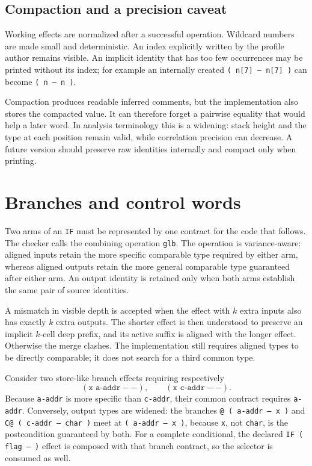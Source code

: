 \documentclass[10pt,a4paper]{article}
\begin{document}
\subsection{Compaction and a precision caveat}

Working effects are normalized after a successful operation.  Wildcard
numbers are made small and deterministic.  An index explicitly written by the
profile author remains visible.  An implicit identity that has too few
occurrences may be printed without its index; for example an internally
created \texttt{( n[7] -- n[7] )} can become \texttt{( n -- n )}.

Compaction produces readable inferred comments, but the implementation also
stores the compacted value.  It can therefore forget a pairwise equality that
would help a later word.  In analysis terminology this is a widening: stack
height and the type at each position remain valid, while correlation precision
can decrease.  A future version should preserve raw identities internally and
compact only when printing.

\section{Branches and control words}

Two arms of an \texttt{IF} must be represented by one contract for the code
that follows.  The checker calls the combining operation \texttt{glb}.  The
operation is variance-aware: aligned inputs retain the more specific comparable
type required by either arm, whereas aligned outputs retain the more general
comparable type guaranteed after either arm.  An output identity is retained
only when both arms establish the same pair of source identities.

A mismatch in visible depth is accepted when the effect with $k$ extra inputs
also has exactly $k$ extra outputs.  The shorter effect is then understood to
preserve an implicit $k$-cell deep prefix, and its active suffix is aligned with
the longer effect.  Otherwise the merge clashes.  The implementation still
requires aligned types to be directly comparable; it does not search for a
third common type.

Consider two store-like branch effects requiring respectively
\[
 (\texttt{x a-addr}--), \qquad (\texttt{x c-addr}--).
\]
Because \texttt{a-addr} is more specific than \texttt{c-addr}, their common
contract requires \texttt{a-addr}.  Conversely, output types are widened: the
branches \texttt{@ ( a-addr -- x )} and
\texttt{C@ ( c-addr -- char )} meet at
\texttt{( a-addr -- x )}, because \texttt{x}, not \texttt{char}, is the
postcondition guaranteed by both.  For a complete conditional, the declared
\texttt{IF ( flag -- )} effect is composed with that branch contract, so the
selector is consumed as well.
\end{document}
